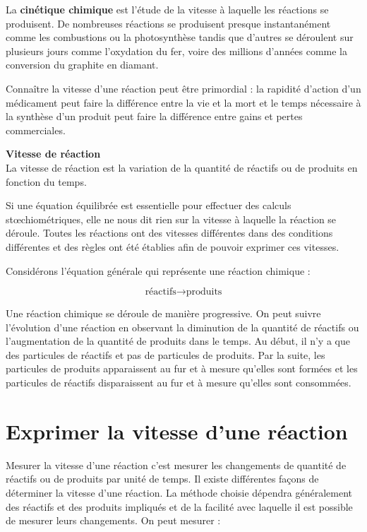 \documentclass[
  11pt,
  a4paper,
  openany]{book}
\begin{document}
La \textbf{cinétique chimique} est l'étude de la vitesse à laquelle les réactions se produisent. De nombreuses réactions se produisent presque instantanément comme les combustions ou la photosynthèse tandis que d'autres se déroulent sur plusieurs jours comme l'oxydation du fer, voire des millions d'années comme la conversion du graphite en diamant.

Connaître la vitesse d'une réaction peut être primordial : la rapidité d'action d'un médicament peut faire la différence entre la vie et la mort et le temps nécessaire à la synthèse d'un produit peut faire la différence entre gains et pertes commerciales.

\begin{tcolorbox}
\textbf{Vitesse de réaction}\\
La vitesse de réaction est la variation de la quantité de réactifs ou de produits en fonction du temps.

\end{tcolorbox}

Si une équation équilibrée est essentielle pour effectuer des calculs stœchiométriques, elle ne nous dit rien sur la vitesse à laquelle la réaction se déroule. Toutes les réactions ont des vitesses différentes dans des conditions différentes et des règles ont été établies afin de pouvoir exprimer ces vitesses.

Considérons l'équation générale qui représente une réaction chimique :

\[
\text{réactifs} \rightarrow \text{produits}
\]

Une réaction chimique se déroule de manière progressive. On peut suivre l'évolution d'une réaction en observant la diminution de la quantité de réactifs ou l'augmentation de la quantité de produits dans le temps. Au début, il n'y a que des particules de réactifs et pas de particules de produits. Par la suite, les particules de produits apparaissent au fur et à mesure qu'elles sont formées et les particules de réactifs disparaissent au fur et à mesure qu'elles sont consommées.

\hypertarget{exprimer-la-vitesse-dune-ruxe9action}{%
\section{Exprimer la vitesse d'une réaction}\label{exprimer-la-vitesse-dune-ruxe9action}}

Mesurer la vitesse d'une réaction c'est mesurer les changements de quantité de réactifs ou de produits par unité de temps. Il existe différentes façons de déterminer la vitesse d'une réaction. La méthode choisie dépendra généralement des réactifs et des produits impliqués et de la facilité avec laquelle il est possible de mesurer leurs changements. On peut mesurer :
\end{document}
